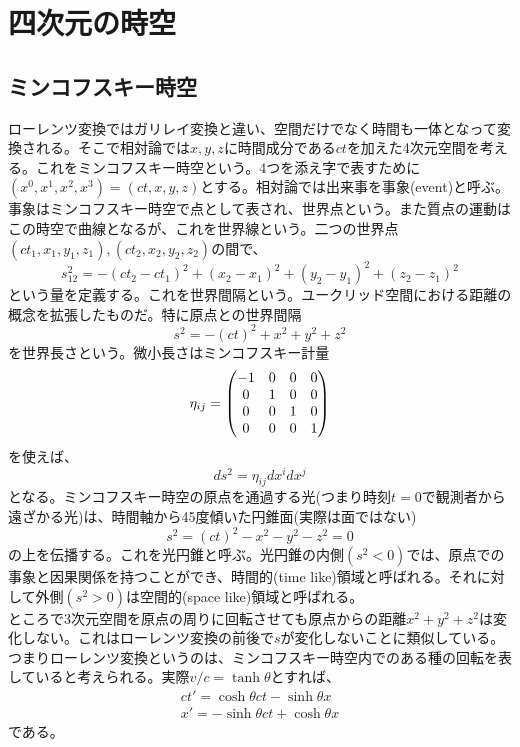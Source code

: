     \section{四次元の時空}
        \subsection{ミンコフスキー時空}
            ローレンツ変換ではガリレイ変換と違い、空間だけでなく時間も一体となって変換される。そこで相対論では$x,y,z$に時間成分である$ct$を加えた4次元空間を考える。これをミンコフスキー時空という。4つを添え字で表すために$(x^0,x^1,x^2,x^3)=(ct,x,y,z)$とする。相対論では出来事を事象(event)と呼ぶ。事象はミンコフスキー時空で点として表され、世界点という。また質点の運動はこの時空で曲線となるが、これを世界線という。二つの世界点$(ct_1,x_1,y_1,z_1),(ct_2,x_2,y_2,z_2)$の間で、
                \[s_{12}^2 = -(ct_2-ct_1)^2+(x_2-x_1)^2+(y_2-y_1)^2+(z_2-z_1)^2\]
            という量を定義する。これを世界間隔という。ユークリッド空間における距離の概念を拡張したものだ。特に原点との世界間隔
                \[s^2 = -(ct)^2+x^2+y^2+z^2\]
            を世界長さという。微小長さはミンコフスキー計量
                \[\eta_{ij} = \begin{pmatrix} 
                    -1 & 0 & 0 & 0\\
                    0 & 1 & 0 & 0\\
                    0 & 0 & 1 & 0\\
                    0 & 0 & 0 & 1
                 \end{pmatrix}\]
            を使えば、
                \[ds^2 = \eta_{ij}dx^idx^j\]
            となる。ミンコフスキー時空の原点を通過する光(つまり時刻$t=0$で観測者から遠ざかる光)は、時間軸から45度傾いた円錐面(実際は面ではない)
                \[s^2 = (ct)^2-x^2-y^2-z^2 = 0\]
            の上を伝播する。これを光円錐と呼ぶ。光円錐の内側$(s^2<0)$では、原点での事象と因果関係を持つことができ、時間的(time like)領域と呼ばれる。それに対して外側$(s^2>0)$は空間的(space like)領域と呼ばれる。\\
            ところで3次元空間を原点の周りに回転させても原点からの距離$x^2+y^2+z^2$は変化しない。これはローレンツ変換の前後で$s$が変化しないことに類似している。つまりローレンツ変換というのは、ミンコフスキー時空内でのある種の回転を表していると考えられる。実際$v/c=\tanh\theta$とすれば、
            \begin{align*}
                ct' = \cosh\theta ct - \sinh\theta x\\
                x' = -\sinh\theta ct + \cosh\theta x
            \end{align*}
            である。
